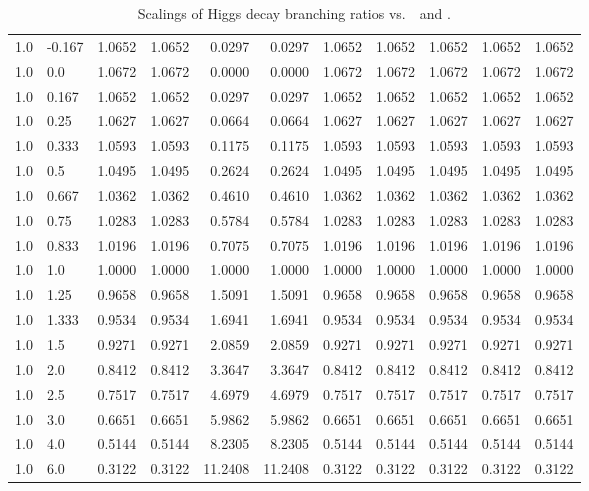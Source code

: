 \begin{table}[h!]
\begin{tabular}{ll rrrrrrrrr}
   1.0  & -0.167 & 1.0652 & 1.0652 & 0.0297     & 0.0297    & 1.0652 & 1.0652 & 1.0652          & 1.0652     & 1.0652 \\
   1.0  & 0.0    & 1.0672 & 1.0672 & 0.0000     & 0.0000    & 1.0672 & 1.0672 & 1.0672          & 1.0672     & 1.0672 \\
   1.0  & 0.167  & 1.0652 & 1.0652 & 0.0297     & 0.0297    & 1.0652 & 1.0652 & 1.0652          & 1.0652     & 1.0652 \\
   1.0  & 0.25   & 1.0627 & 1.0627 & 0.0664     & 0.0664    & 1.0627 & 1.0627 & 1.0627          & 1.0627     & 1.0627 \\
   1.0  & 0.333  & 1.0593 & 1.0593 & 0.1175     & 0.1175    & 1.0593 & 1.0593 & 1.0593          & 1.0593     & 1.0593 \\
   1.0  & 0.5    & 1.0495 & 1.0495 & 0.2624     & 0.2624    & 1.0495 & 1.0495 & 1.0495          & 1.0495     & 1.0495 \\
   1.0  & 0.667  & 1.0362 & 1.0362 & 0.4610     & 0.4610    & 1.0362 & 1.0362 & 1.0362          & 1.0362     & 1.0362 \\
   1.0  & 0.75   & 1.0283 & 1.0283 & 0.5784     & 0.5784    & 1.0283 & 1.0283 & 1.0283          & 1.0283     & 1.0283 \\
   1.0  &  0.833 & 1.0196 & 1.0196 & 0.7075     & 0.7075    & 1.0196 & 1.0196 & 1.0196          & 1.0196     & 1.0196 \\
   1.0  & 1.0    & 1.0000 & 1.0000 & 1.0000     & 1.0000    & 1.0000 & 1.0000 & 1.0000          & 1.0000     & 1.0000 \\
   1.0  & 1.25   & 0.9658 & 0.9658 & 1.5091     & 1.5091    & 0.9658 & 0.9658 & 0.9658          & 0.9658     & 0.9658 \\
   1.0  & 1.333  & 0.9534 & 0.9534 & 1.6941     & 1.6941    & 0.9534 & 0.9534 & 0.9534          & 0.9534     & 0.9534 \\
   1.0  & 1.5    & 0.9271 & 0.9271 & 2.0859     & 2.0859    & 0.9271 & 0.9271 & 0.9271          & 0.9271     & 0.9271 \\
   1.0  & 2.0    & 0.8412 & 0.8412 & 3.3647     & 3.3647    & 0.8412 & 0.8412 & 0.8412          & 0.8412     & 0.8412 \\
   1.0  & 2.5    & 0.7517 & 0.7517 & 4.6979     & 4.6979    & 0.7517 & 0.7517 & 0.7517          & 0.7517     & 0.7517 \\
   1.0  & 3.0    & 0.6651 & 0.6651 & 5.9862     & 5.9862    & 0.6651 & 0.6651 & 0.6651          & 0.6651     & 0.6651 \\
   1.0  & 4.0    & 0.5144 & 0.5144 & 8.2305     & 8.2305    & 0.5144 & 0.5144 & 0.5144          & 0.5144     & 0.5144 \\
   1.0  & 6.0    & 0.3122 & 0.3122 & 11.2408    & 11.2408   & 0.3122 & 0.3122 & 0.3122          & 0.3122     & 0.3122 \\\hline
    \end{tabular}
    \caption[Scalings of Higgs decay branching ratios vs.\ \Ct\ and  ]{Scalings of Higgs decay branching ratios vs.\ \Ct\ and .}\label{tab:brscalingK6_1}
 \end{table}

